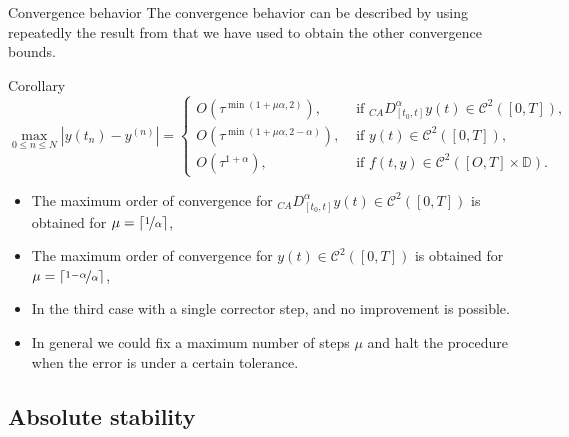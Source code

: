 \documentclass[aspectratio=169,xcolor=dvipsnames]{beamer}
\begin{document}
\begin{frame}{Convergence behavior}
The convergence behavior can be described by using repeatedly the result from \parencite[Lemma 3.1]{FractionalAdamsMethodsAnalysis} that we have used to obtain the other convergence bounds.

\begin{alertblock}{Corollary}
\[
\max_{0 \leq n \leq N} |y(t_n) - y^{(n)}| = \begin{cases}
O(\tau^{\min(1+\mu\alpha,2) }), & \text{ if } {}_{CA} D_{[t_0,t]}^\alpha y(t) \in \mathcal{C}^2([0,T]),\\
O(\tau^{\min(1+\mu\alpha,2-\alpha)}), & \text{ if } y(t) \in \mathcal{C}^2([0,T]),\\
O(\tau^{1+\alpha}), & \text{ if } f(t,y) \in \mathcal{C}^2([O,T]\times\mathbb{D}).
\end{cases}
\]
\end{alertblock}
\begin{itemize}
	\item<2-> The maximum order of convergence for ${}_{CA} D_{[t_0,t]}^\alpha y(t) \in \mathcal{C}^2([0,T])$ is obtained for $\mu = \lceil \nicefrac{1}{\alpha} \rceil$,
	\item<3-> The maximum order of convergence for $y(t) \in \mathcal{C}^2([0,T])$ is obtained for $\mu = \lceil \nicefrac{1-\alpha}{\alpha} \rceil$,
	\item<4-> In the third case with a single corrector step, and no improvement is possible.
	\item[\faLightbulb]<5> In general we could fix a maximum number of steps $\mu$ and halt the procedure when the error is under a certain tolerance.
\end{itemize}
\end{frame}

\subsection{Absolute stability}
\end{document}
